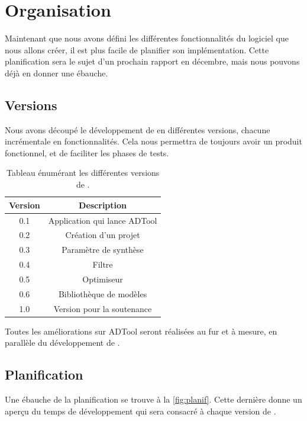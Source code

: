 \section{Organisation}
	Maintenant que nous avons défini les différentes fonctionnalités du logiciel que nous allons créer, il est plus facile de planifier son implémentation. Cette planification sera le sujet d'un prochain rapport en décembre, mais nous pouvons déjà en donner une ébauche.

	\subsection{Versions}
		Nous avons découpé le développement de \glasir{} en différentes versions, chacune incrémentale en fonctionnalités. Cela nous permettra de toujours avoir un produit fonctionnel, et de faciliter les phases de tests.

		\begin{table}[h!]
			\begin{center}
			\begin{tabular}{|c|c|}
				\hline
				Version & Description\\
				\hline
				0.1 & Application qui lance ADTool\\
				\hline
				0.2 & Création d'un projet\\
				\hline
				0.3 & Paramètre de synthèse\\
				\hline
				0.4 & Filtre\\
				\hline
				0.5 & Optimiseur\\
				\hline
				0.6 & Bibliothèque de modèles\\
				\hline
				1.0 & Version pour la soutenance\\
				\hline
			\end{tabular}
			\end{center}
			\caption{Tableau énumérant les différentes versions de \glasir{}.}
		\end{table} %

		Toutes les améliorations sur ADTool seront réalisées au fur et à mesure, en parallèle du développement de \glasir{}.

	\subsection{Planification}
		Une ébauche de la planification se trouve à la {} \ref{fig:planif}. Cette dernière donne un aperçu du temps de développement qui sera consacré à chaque version de \glasir{}. 

